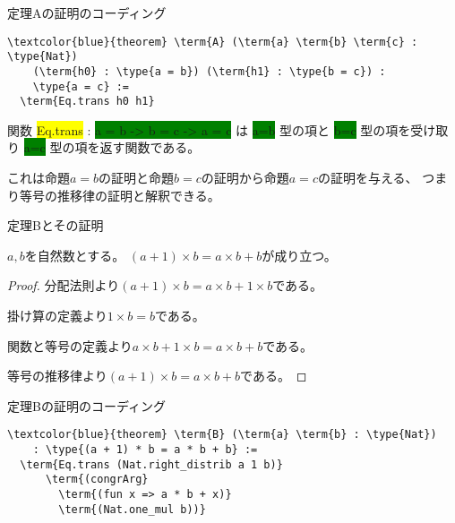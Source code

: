 \documentclass[unicode,12pt]{beamer}%
\newcommand{\type}[1]{\colorbox{green}{#1}}
\newcommand{\term}[1]{\colorbox{yellow}{#1}}
\begin{document}
\begin{frame}[fragile]{定理Aの証明のコーディング}
  \begin{tcolorbox}[title=SecondTheorems.lean]
  \setlength{\baselineskip}{12pt}
  \begin{Verbatim}[commandchars=\\\{\}, baselinestretch=1.5]
\textcolor{blue}{theorem} \term{A} (\term{a} \term{b} \term{c} : \type{Nat})
    (\term{h0} : \type{a = b}) (\term{h1} : \type{b = c}) :
    \type{a = c} :=
  \term{Eq.trans h0 h1}
  \end{Verbatim}
  \end{tcolorbox}  

  \pause

  関数 \term{Eq.trans} : \type{a = b -> b = c -> a = c} は
  \type{a=b} 型の項と \type{b=c} 型の項を受け取り \type{a=c} 型の項を返す関数である。

  これは命題$a=b$の証明と命題$b=c$の証明から命題$a=c$の証明を与える、
  つまり等号の推移律の証明と解釈できる。
\end{frame}

\begin{frame}{定理Bとその証明}
  \begin{theorem}
    $a, b$を自然数とする。
    $(a+1)\times b=a\times b+b$が成り立つ。      
  \end{theorem}

  \begin{proof}
    分配法則より$(a+1)\times b=a\times b+1\times b$である。

    掛け算の定義より$1\times b= b$である。
    
    関数と等号の定義より$a\times b+1\times b=a\times b+ b$である。
    
    等号の推移律より$(a+1)\times b=a\times b+b$である。    
  \end{proof}
\end{frame}

\begin{frame}[fragile]{定理Bの証明のコーディング}
  \begin{tcolorbox}[title=SecondTheorems.lean]
  \setlength{\baselineskip}{12pt}
  \begin{Verbatim}[commandchars=\\\{\}, baselinestretch=1.5]
\textcolor{blue}{theorem} \term{B} (\term{a} \term{b} : \type{Nat})
    : \type{(a + 1) * b = a * b + b} :=
  \term{Eq.trans (Nat.right_distrib a 1 b)}
      \term{(congrArg}
        \term{(fun x => a * b + x)}
        \term{(Nat.one_mul b))}
  \end{Verbatim}
  \end{tcolorbox}  
\end{frame}
\end{document}
